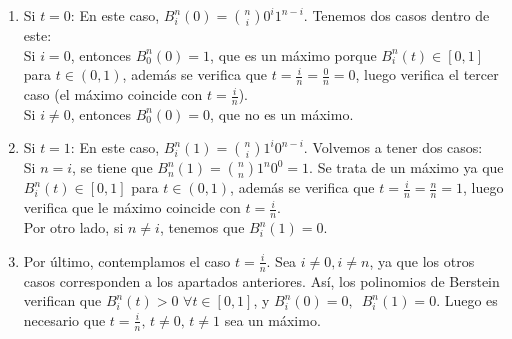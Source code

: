 \documentclass[12pt,a4paper]{article}
\begin{document}
\begin{enumerate}
\item Si $t=0$: En este caso, $B_i^n(0)=\binom{n}{i}0^i 1^{n-i}$. Tenemos
  dos casos dentro de este:\\
  Si $i=0$, entonces $B_0^n(0)=1$, que es un
  máximo porque $B_i^n(t)\in \left [ 0,1 \right ]$ para $t\in (0,1)$,
  además se verifica que $t=\frac{i}{n}=\frac{0}{n}=0$, luego verifica el
  tercer caso (el máximo coincide con $t=\frac{i}{n}$).\\
  Si $i\neq 0$, entonces $B_0^n(0)=0$, que no es un máximo.
\item Si $t=1$: En este caso, $B_i^n(1)=\binom{n}{i}1^i 0^{n-i}$. Volvemos
  a tener dos casos:\\
  Si $n=i$, se tiene que $B_n^n(1) = \binom{n}{n} 1^n 0^0 = 1$. Se trata de
  un máximo ya que $B_i^n(t) \in \left [ 0,1 \right ]$ para $t\in
  (0,1)$, además se verifica que $t=\frac{i}{n}=\frac{n}{n} = 1$, luego
  verifica que le máximo coincide con $t=\frac{i}{n}$.\\
  Por otro lado, si $n \neq i$, tenemos que $B_i^n(1) = 0$.
\item Por último, contemplamos el caso $t=\frac{i}{n}$. Sea $i \neq 0, i
  \neq n$, ya que los otros casos corresponden a los apartados
  anteriores. Así, los polinomios de Berstein verifican que $ B_{i}^{n}(t)
  > 0\,\, \forall t \in [0,1]$, y $B_{i}^{n}(0) = 0,\,\,\,
  B_{i}^{n}(1)=0$. Luego es necesario que $t=\frac{i}{n},\,t\neq 0,\,t \neq
  1$ sea un máximo.

\end{enumerate}
\end{document}
